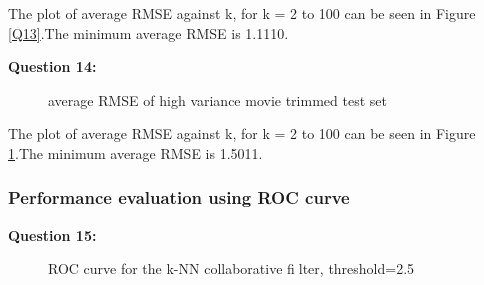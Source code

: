 \documentclass{article}
\begin{document}
The plot of average RMSE against k, for k = 2 to 100 can be seen in Figure \ref{Q13}.The minimum average RMSE is 1.1110.
\newline

\bigbreak \textbf{Question 14:}
\begin{figure}
\centering
{}
\caption{average RMSE of high variance movie trimmed test set} \label{Q14}
\end{figure}

The plot of average RMSE against k, for k = 2 to 100 can be seen in Figure \ref{Q14}.The minimum average RMSE is 1.5011.
\newline

\subsubsection{Performance evaluation using ROC curve}

\bigbreak \textbf{Question 15:}
\begin{figure}
\centering
{}
\caption{ROC curve for the k-NN collaborative filter, threshold=2.5} \label{Q15_1}
\end{figure}
\end{document}

